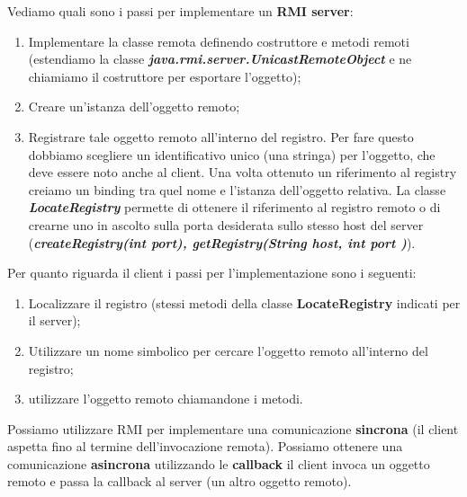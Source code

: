 \documentclass[12pt]{article}
\begin{document}
		Vediamo quali sono i passi per implementare un \textbf{RMI server}:
		\begin{enumerate}
			\item Implementare la classe remota definendo costruttore e metodi remoti (estendiamo la classe \textit{\textbf{java.rmi.server.UnicastRemoteObject }} e ne chiamiamo il costruttore per esportare l'oggetto);
			\item Creare un'istanza dell'oggetto remoto;
			\item Registrare tale oggetto remoto all'interno del registro. Per fare questo dobbiamo scegliere un identificativo unico (una stringa) per l'oggetto, che deve essere noto anche al client. Una volta ottenuto un riferimento al registry creiamo un binding tra quel nome e l'istanza dell'oggetto relativa. La classe \textit{\textbf{LocateRegistry}} permette di ottenere il riferimento al registro remoto o di crearne uno in ascolto sulla porta desiderata sullo stesso host del server (\textbf{\textit{createRegistry(int port), getRegistry(String host, int port )}}). 
		\end{enumerate}
		Per quanto riguarda il client i passi per l'implementazione sono i seguenti:
		\begin{enumerate}
			\item Localizzare il registro (stessi metodi della classe \textbf{LocateRegistry} indicati per il server);
			\item Utilizzare un nome simbolico per cercare l'oggetto remoto all'interno del registro;
			\item utilizzare l'oggetto remoto chiamandone i metodi. 
		\end{enumerate}
		Possiamo utilizzare RMI per implementare una comunicazione \textbf{sincrona} (il client aspetta fino al termine dell'invocazione remota). Possiamo ottenere una comunicazione \textbf{asincrona} utilizzando le \textbf{callback} il client invoca un oggetto remoto e passa la callback al server (un altro oggetto remoto).
		
\end{document}
